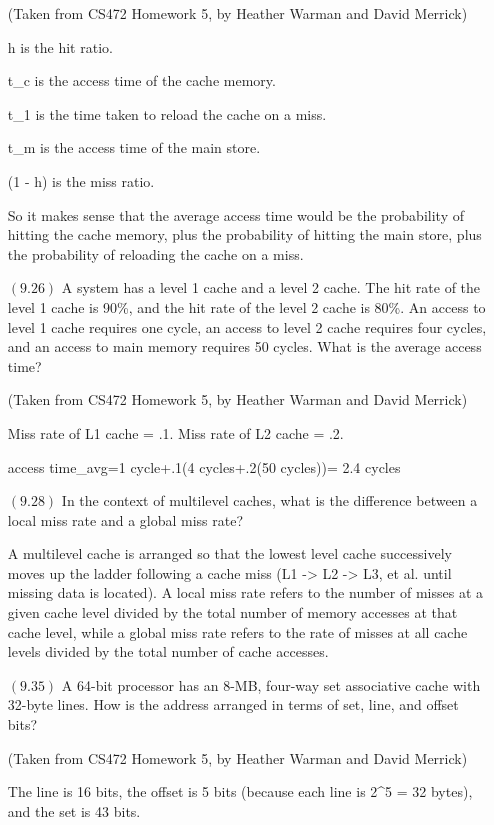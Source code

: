 \documentclass[letterpaper,10pt,titlepage]{article}
\begin{document}
\begin{enumerate}
(Taken from CS472 Homework 5, by Heather Warman and David Merrick)

h is the hit ratio.

t\_c is the access time of the cache memory.

t\_1 is the time taken to reload the cache on a miss.

t\_m is the access time of the main store.

(1 - h) is the miss ratio.

So it makes sense that the average access time would be the probability of hitting the cache memory, plus the probability of hitting the main store, plus the probability of reloading the cache on a miss.


\item[$(9.26)$] A system has a level 1 cache and a level 2 cache. The hit rate of the level 1 cache is 90\%, and the hit rate of
the level 2 cache is 80\%. An access to level 1 cache requires one cycle, an access to level 2 cache requires four cycles, and an access to main memory requires 50 cycles. What is the average access time? 

(Taken from CS472 Homework 5, by Heather Warman and David Merrick)

Miss rate of L1 cache = .1. 
Miss rate of L2 cache = .2. 

access time\_avg=1 cycle+.1(4 cycles+.2(50 cycles))= 2.4 cycles


\item[$(9.28)$] In the context of multilevel caches, what is the difference between a local miss rate and a global miss rate?

A multilevel cache is arranged so that the lowest level cache successively moves up the ladder following a cache miss (L1 -> L2 -> L3, et al. until missing data is located). A local miss rate refers to the number of misses at a given cache level divided by the total number of memory accesses at that cache level, while a global miss rate refers to the rate of misses at all cache levels divided by the total number of cache accesses.

\item[$(9.35)$] A 64-bit processor has an 8-MB, four-way set associative cache with 32-byte lines. How is the address arranged in terms of set, line, and offset bits? 

(Taken from CS472 Homework 5, by Heather Warman and David Merrick)

The line is 16 bits, the offset is 5 bits (because each line is 2^5 = 32 bytes), and the set is 43 bits.


\end{enumerate}
\end{document}
